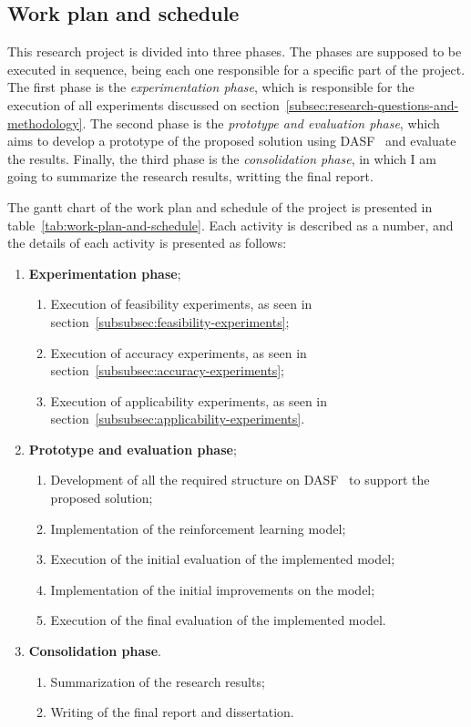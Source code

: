 \subsection{Work plan and schedule}
\label{subsec:work-plan-and-schedule}

This research project is divided into three phases.
The phases are supposed to be executed in sequence, being each one responsible for a specific part of the project.
The first phase is the \emph{experimentation phase}, which is responsible for the execution of all experiments discussed on section~\ref{subsec:research-questions-and-methodology}.
The second phase is the \emph{prototype and evaluation phase}, which aims to develop a prototype of the proposed solution using \ac{DASF}~\cite{dasf} and evaluate the results.
Finally, the third phase is the \emph{consolidation phase}, in which I am going to summarize the research results, writting the final report.

The gantt chart of the work plan and schedule of the project is presented in table~\ref{tab:work-plan-and-schedule}.
Each activity is described as a number, and the details of each activity is presented as follows:

\begin{enumerate}
  \item \textbf{Experimentation phase};
    \begin{enumerate}
      \item Execution of feasibility experiments, as seen in section~\ref{subsubsec:feasibility-experiments};
      \item Execution of accuracy experiments, as seen in section~\ref{subsubsec:accuracy-experiments};
      \item Execution of applicability experiments, as seen in section~\ref{subsubsec:applicability-experiments}.
    \end{enumerate}
  \item \textbf{Prototype and evaluation phase};
    \begin{enumerate}
      \item Development of all the required structure on \ac{DASF}~\cite{dasf} to support the proposed solution;
      \item Implementation of the reinforcement learning model;
      \item Execution of the initial evaluation of the implemented model;
      \item Implementation of the initial improvements on the model;
      \item Execution of the final evaluation of the implemented model.
    \end{enumerate}
  \item \textbf{Consolidation phase}.
    \begin{enumerate}
      \item Summarization of the research results;
      \item Writing of the final report and dissertation.
    \end{enumerate}
\end{enumerate}


